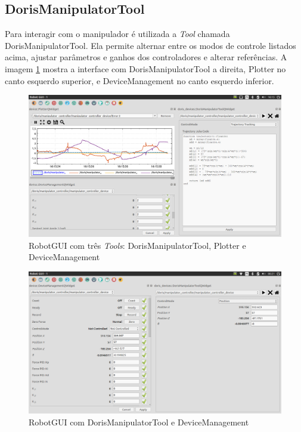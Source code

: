 \subsection{DorisManipulatorTool}
Para interagir com o manipulador é utilizada a \textit{Tool} chamada DorisManipulatorTool. Ela permite alternar entre os modos de controle listados acima, ajustar parâmetros e ganhos dos controladores e alterar referências. A imagem \ref{fig:screenshot1} mostra a interface com DorisManipulatorTool a direita,  Plotter no canto esquerdo superior, e DeviceManagement no canto esquerdo inferior.
 
\begin{figure}[!h]
  \centering
  \includegraphics[width=\linewidth]{./img/screenshot/sc1.png}
  \caption{RobotGUI com três \textit{Tools}: DorisManipulatorTool, Plotter e DeviceManagement}
  \label{fig:screenshot1}
\end{figure}


\begin{figure}[!h]
  \centering
  \includegraphics[width=\linewidth]{./img/screenshot/sc2.png}
  \caption{RobotGUI com DorisManipulatorTool e DeviceManagement}
  \label{fig:screenshot2}
\end{figure}

